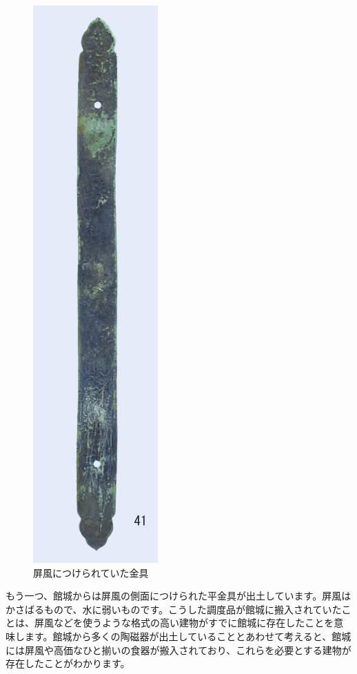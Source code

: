 \documentclass[11pt,report]{jsbook}
\begin{document}
\begin{figure}
\vspace*{-\intextsep} 
\centering
\includegraphics[width=15truemm]{fig/18.png}
\caption{屏風につけられていた金具}
\label{fig18}
\end{figure}

もう一つ、館城からは屏風の側面につけられた平金具が出土しています。屏風はかさばるもので、水に弱いものです。こうした調度品が館城に搬入されていたことは、屏風などを使うような格式の高い建物がすでに館城に存在したことを意味します。館城から多くの陶磁器が出土していることとあわせて考えると、館城には屏風や高価なひと揃いの食器が搬入されており、これらを必要とする建物が存在したことがわかります。
\end{document}
